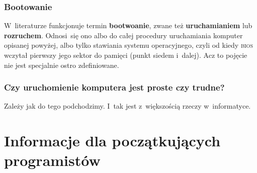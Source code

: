 \documentclass[10pt,t]{beamer}
\begin{document}
\begin{frame}
  \frametitle{Bootowanie}


  W~literaturze funkcjonuje termin \textbf{bootwoanie}, zwane też
  \textbf{uruchamianiem} lub \textbf{rozruchem}. Odnosi~się ono albo do
  całej procedury uruchamiania komputer opisanej powyżej, albo tylko
  stawiania systemu operacyjnego, czyli od kiedy \textsc{bios} wczytał
  pierwszy jego sektor do pamięci (punkt siedem i~dalej). Acz to pojęcie
  nie jest specjalnie ostro zdefiniowane.

\end{frame}





\begin{frame}
  \frametitle{Czy uruchomienie komputera jest proste czy trudne?}


  Zależy jak do tego podchodzimy. I~tak jest z~większością rzeczy
  w~informatyce.

\end{frame}

















\section{Informacje dla początkujących programistów}
\end{document}
